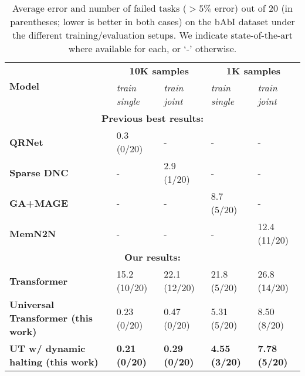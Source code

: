 \begin{table}[t!]
\centering
\caption{Average error and number of failed tasks ($> 5\%$ error) out of 20 (in parentheses; lower is better in both cases) on the bAbI dataset under the different training/evaluation setups. We indicate state-of-the-art where available for each, or `-' otherwise.}
\label{tab:babi-results}
\begin{adjustbox}{max width=\textwidth}
\begin{tabular}{lllll}
& & & & \\ \toprule
\multirow{2}{*}{ \bf Model } & \multicolumn{2}{c}{ \bf 10K samples } & \multicolumn{2}{c}{ \bf 1K samples } \\ \cmidrule{2-5}
& \textit{train single} & \textit{train joint} & \textit{train single} & \textit{train joint} \\ \midrule
\multicolumn{5}{c}{\bf Previous best results:} \\ \midrule
\bf QRNet~\citep{seo2016query} & 0.3 (0/20) & - & - & - \\
\bf Sparse DNC~\citep{rae2016scaling} & - & 2.9 (1/20) & - & - \\
\bf GA+MAGE~\cite{dhingra2017linguistic} & - & - & 8.7 (5/20) & - \\
\bf MemN2N~\cite{sukhbaatar2015} & - & - & -  & 12.4 (11/20) \\\midrule
\multicolumn{5}{c}{\bf Our results:} \\ \midrule
\bf Transformer~\citep{transformer} & 15.2 (10/20) & 22.1 (12/20) & 21.8 (5/20) & 26.8 (14/20) \\
\bf Universal Transformer (this work) & 0.23 (0/20) & 0.47 (0/20) & 5.31 (5/20) & 8.50 (8/20) \\
\bf UT w/ dynamic halting (this work) & {\bf 0.21 (0/20)} & {\bf 0.29 (0/20)} & {\bf 4.55 (3/20)} & {\bf 7.78 (5/20)} \\ \bottomrule
\end{tabular}
\end{adjustbox}
\end{table}
